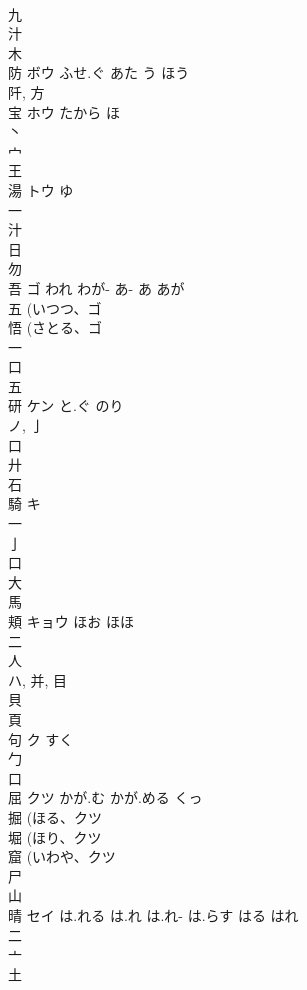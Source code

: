 \documentclass[8pt]{extreport}
\begin{document}
\begin{CJK}{UTF8}{min}
\\	九 
\\	汁 
\\	木 
\\	防	ボウ	ふせ.ぐ あた う ほう	
\\	阡, 方 
\\	宝	ホウ	たから ほ	
\\	丶 
\\	宀 
\\	王 
\\	湯	トウ	ゆ	
\\	一 
\\	汁 
\\	日 
\\	勿 
\\	吾	ゴ	われ わが- あ- あ あが	
\\	五 (いつつ、ゴ 
\\	悟 (さとる、ゴ 
\\	一 
\\	口 
\\	五 
\\	研	ケン	と.ぐ のり	
\\	ノ, 亅 
\\	口 
\\	廾 
\\	石 
\\	騎	キ		
\\	一 
\\	亅 
\\	口 
\\	大 
\\	馬 
\\	頬	キョウ	ほお ほほ	
\\	二 
\\	人 
\\	ハ, 并, 目 
\\	貝 
\\	頁 
\\	句	ク	すく	
\\	勹 
\\	口 
\\	屈	クツ	かが.む かが.める くっ	
\\	掘 (ほる、クツ 
\\	堀 (ほり、クツ 
\\	窟 (いわや、クツ 
\\	尸 
\\	山 
\\	晴	セイ	は.れる は.れ は.れ- は.らす はる はれ	
\\	二 
\\	亠 
\\	土 

\end{CJK}
\end{document}
